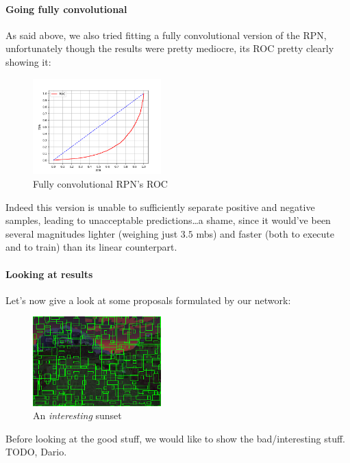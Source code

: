 \documentclass[10pt,journal,cspaper,compsoc]{IEEEtran}
\begin{document}
    \paragraph{Going fully convolutional} As said above, we also tried fitting a fully convolutional version of the RPN, unfortunately though the results were pretty mediocre, its ROC pretty clearly showing it:

    \begin{figure}[h]
        \centering
        \includegraphics[width=0.44\textwidth]{images/ROC_conv.png}
        \caption{Fully convolutional RPN's ROC}
    \end{figure}

    Indeed this version is unable to sufficiently separate positive and negative samples, leading to unacceptable predictions\dots a shame, since it would've been several magnitudes lighter (weighing just $3.5$ mbs) and faster (both to execute and to train) than its linear counterpart.
    \newpage
    \paragraph{Looking at results} Let's now give a look at some proposals formulated by our network:

    \begin{figure}[h]
        \centering
        \includegraphics[width=0.44\textwidth]{images/sunset.png}
        \caption{An \emph{interesting} sunset}
    \end{figure}

    Before looking at the good stuff, we would like to show the bad/interesting stuff.  TODO, Dario.
\end{document}
